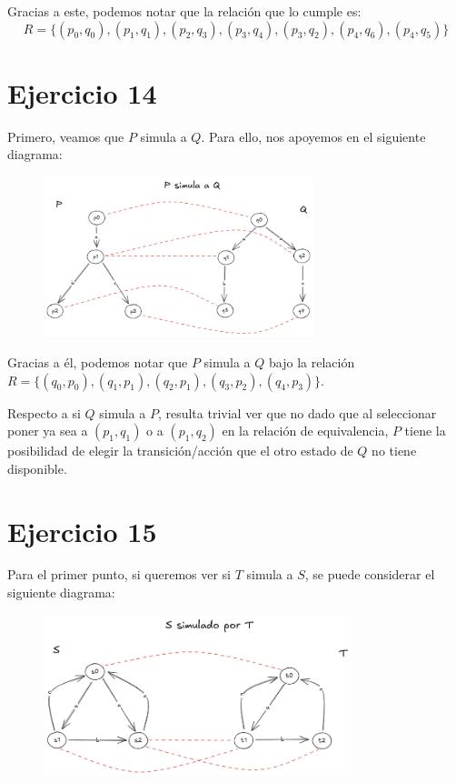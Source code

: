 \documentclass{article}
\begin{document}
Gracias a este, podemos notar que la relación que lo cumple es:
\begin{equation*}
	R = \{(p_0, q_0), (p_1, q_1), (p_2, q_3), (p_3, q_4), (p_3, q_2), (p_4, q_6), (p_4, q_5)\}
\end{equation*}

\section*{Ejercicio 14}
Primero, veamos que $P$ simula a $Q$.
Para ello, nos apoyemos en el siguiente diagrama:
\begin{figure}[!htb]
	\includegraphics[width=0.7\textwidth]{02-14.png}
	\centering
\end{figure}

Gracias a él, podemos notar que $P$ simula a $Q$ bajo la relación $R = \{(q_0, p_0), (q_1, p_1), (q_2, p_1), (q_3,p_2), (q_4,p_3)\}$.

Respecto a si $Q$ simula a $P$, resulta trivial ver que no dado que al seleccionar poner ya sea a $(p_1, q_1)$ o a $(p_1, q_2)$ en la relación de equivalencia, $P$ tiene la posibilidad de elegir la transición/acción que el otro estado de $Q$ no tiene disponible.

\pagebreak
\section*{Ejercicio 15}
Para el primer punto, si queremos ver si $T$ simula a $S$, se puede considerar el siguiente diagrama:
\begin{figure}[!htb]
	\includegraphics[width=0.8\textwidth]{02-15-a.png}
	\centering
\end{figure}
\end{document}
